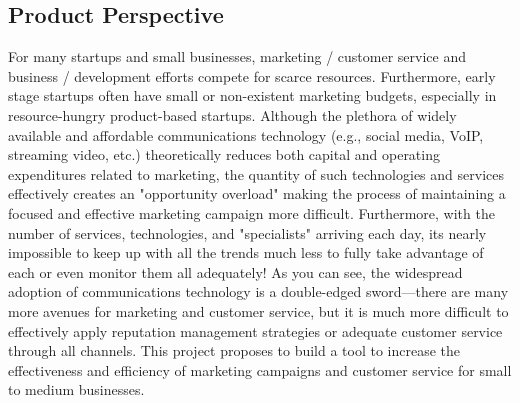 \documentclass{report}
\begin{document}
     \subsection{Product Perspective}
		For many startups and small businesses, marketing /
                customer service and business / development efforts
                compete for scarce resources.  Furthermore, early
                stage startups often have small or non-existent
                marketing budgets, especially in resource-hungry
                product-based startups.  Although the plethora of
                widely available and affordable communications
                technology (e.g., social media, VoIP, streaming video,
                etc.) theoretically reduces both capital and operating
                expenditures related to marketing, the quantity of
                such technologies and services effectively creates an
                "opportunity overload" making the process of
                maintaining a focused and effective marketing campaign
                more difficult.  Furthermore, with the number of
                services, technologies, and "specialists" arriving
                each day, its nearly impossible to keep up with all
                the trends much less to fully take advantage of each
                or even monitor them all adequately! As you can see,
                the widespread adoption of communications technology
                is a double-edged sword---there are many more avenues
                for marketing and customer service, but it is much
                more difficult to effectively apply reputation
                management strategies or adequate customer service
                through all channels. This project proposes to build a
                tool to increase the effectiveness and efficiency of
                marketing campaigns and customer service for small to
				medium businesses.
\end{document}
